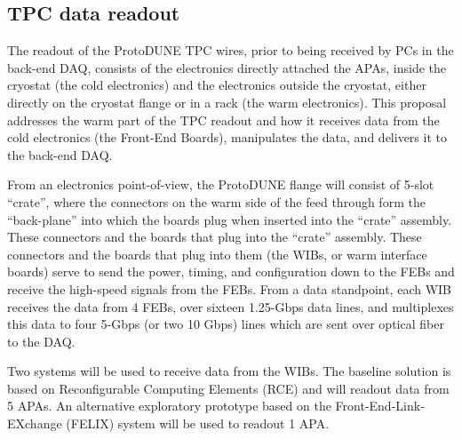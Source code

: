 \subsection{TPC data readout}


The readout of the ProtoDUNE TPC wires, prior to being received by PCs in
the back-end DAQ, consists of the electronics directly attached the APAs,
inside the cryostat (the cold electronics) and the electronics outside
the cryostat, either directly on the cryostat flange or in a rack (the
warm electronics).  This proposal 
addresses the warm part of the TPC
readout and how it receives data from the cold electronics (the Front-End
Boards), manipulates the data, and delivers it to the back-end DAQ.

From an electronics point-of-view, the ProtoDUNE flange will consist of
5-slot ``crate'', where the connectors on the warm side of the feed
through form the ``back-plane'' into which the boards plug when inserted
into the ``crate'' assembly.  These connectors and the boards that plug
into the ``crate'' assembly.  These connectors and the boards that plug
into them (the WIBs, or warm interface boards) serve to send the power,
timing, and configuration down to the FEBs and receive the high-speed
signals from the FEBs. From a data standpoint, each WIB receives the
data from 4 FEBs, over sixteen 1.25-Gbps data lines, and multiplexes
this data to four 5-Gbps (or two 10 Gbps) lines which are sent over
optical fiber to the DAQ.

Two systems will be used to receive data from the WIBs.  The baseline
solution is based on Reconfigurable Computing Elements (RCE) and will
readout data from 5 APAs.  An alternative exploratory prototype based on
the Front-End-Link-EXchange (FELIX) system will be used to readout 1 APA.

